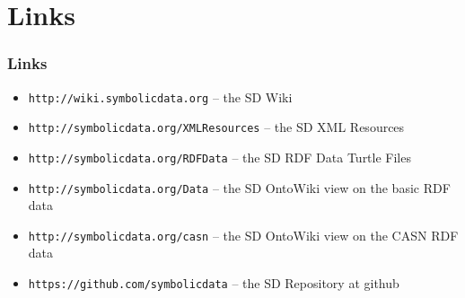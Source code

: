 \documentclass{beamer}
\begin{document}

\section{Links}
\begin{frame}\frametitle{Links}\small
\begin{itemize}
\item \texttt{http://wiki.symbolicdata.org} -- the SD Wiki
\item \texttt{http://symbolicdata.org/XMLResources} -- the SD XML Resources
\item \texttt{http://symbolicdata.org/RDFData} -- the SD RDF Data Turtle Files
\item \texttt{http://symbolicdata.org/Data} -- the SD OntoWiki view on the
  basic RDF data
\item \texttt{http://symbolicdata.org/casn} -- the SD OntoWiki view on the
  CASN RDF data
\item \texttt{https://github.com/symbolicdata} -- the SD Repository at github
\end{itemize}
\end{frame}
\end{document}
